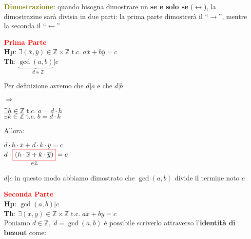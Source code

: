 \begin{boxA}
    \textcolor{olive}{\textbf{Dimostrazione}}: quando bisogna dimostrare un \textbf{se e solo se} ($\longleftrightarrow$), la dimostrazine sarà divisia in due parti: la prima parte dimostrerà il ``$\rightarrow$'', mentre la seconda il ``$\leftarrow$'' 

    \textcolor{red}{\textbf{Prima Parte}} \\
    \textbf{Hp}: $\exists (\overline{x}, \overline{y}) \in \mathbb{Z} \times \mathbb{Z} \; \text{t.c.} \; a\overline{x} + b\overline{y} = c$ \\
    \textbf{Th}: $\underset{d \in \mathbb{Z}}{\underbrace{\gcd (a, b)}|c}$
    
    \begin{center}
        \centering
        \begin{minipage}[t]{0.4\textwidth}
            Per definizione avremo che $d|a$ e che $d|b$
        \end{minipage}
        $\Rightarrow$
        \begin{minipage}[t]{0.4\textwidth}
            \centering
            $\exists h \in \mathbb{Z} \; \text{t.c.} \; a = d \cdot h$ \\
            $\exists k \in \mathbb{Z} \; \text{t.c.} \; b = d \cdot k$
        \end{minipage}
    \end{center}
    Allora:
    \begin{center}
        \centering
        \begin{minipage}[t]{0.4\textwidth}
            \centering
            $d \cdot h \cdot \overline{x} + d \cdot k \cdot \overline{y} = c$ \\
            $d \cdot \underset{\in \mathbb{Z}}{\fcolorbox{red}{white}{$(h \cdot \overline{x} + k \cdot \overline{y})$}} = c$
        \end{minipage}
        \begin{minipage}[t]{0.5\textwidth}
            \centering
            $d|c$ in questo modo abbiamo dimostrato che $\gcd (a, b)$ divide il termine noto $c$
        \end{minipage}
    \end{center}

    \textcolor{red}{\textbf{Seconda Parte}} \\
    \textbf{Hp}: $\gcd (a, b)|c$ \\
    \textbf{Th}: $\exists (\overline{x}, \overline{y}) \in \mathbb{Z} \times \mathbb{Z} \; \text{t.c.} \; a\overline{x} + b\overline{y} = c$ \\
    Poniamo $d \in \mathbb{Z}, \; d = \gcd (a, b)$ è possibile scriverlo attraverso l'\textbf{identità di bezout} come:
    

\end{boxA}
